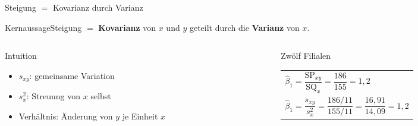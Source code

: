 \documentclass[aspectratio=169,11pt]{beamer}
\newcommand{\kernaussage}[1]{\begin{alertblock}{Kernaussage}#1\end{alertblock}}
\newcommand{\SQx}{\text{SQ}_x}
\newcommand{\SPxy}{\text{SP}_{xy}}
\begin{document}
\begin{frame}{Steigung $=$ Kovarianz durch Varianz}
  \kernaussage{Steigung $=$ \textbf{Kovarianz} von $x$ und $y$ geteilt durch die
    \textbf{Varianz} von $x$.}

  \medskip

  \begin{columns}[T]
    \begin{column}{0.5\textwidth}
      \begin{block}{Intuition}
        \begin{itemize}
          \item $s_{xy}$: gemeinsame Variation
          \item $s_x^{2}$: Streuung von $x$ selbst
          \item Verhältnis: Änderung von $y$ je Einheit $x$
        \end{itemize}
      \end{block}
    \end{column}
    \begin{column}{0.48\textwidth}
      \begin{exampleblock}{Zwölf Filialen}
        \renewcommand{\arraystretch}{1.6}
        \begin{tabular}{@{}l@{}}
          $\hat{\beta}_1 = \dfrac{\SPxy}{\SQx} = \dfrac{186}{155} = 1{,}2$ \\
          $\hat{\beta}_1 = \dfrac{s_{xy}}{s_x^{2}} = \dfrac{186/11}{155/11} = \dfrac{16{,}91}{14{,}09} = 1{,}2$
        \end{tabular}
      \end{exampleblock}
    \end{column}
  \end{columns}
\end{frame}
\end{document}
